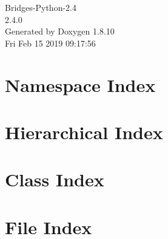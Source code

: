\documentclass[twoside]{book}
\newcommand{\+}{\discretionary{\mbox{\scriptsize$\hookleftarrow$}}{}{}}
\newcommand{\clearemptydoublepage}{%
  \newpage{\pagestyle{empty}\cleardoublepage}%
}
\begin{document}
\hypersetup{pageanchor=false,
             bookmarks=true,
             bookmarksnumbered=true,
             pdfencoding=unicode
            }
\begin{titlepage}
\vspace*{7cm}
\begin{center}%
{\Large Bridges-\/\+Python-\/2.4 \\[1ex]\large 2.\+4.\+0 }\\
\vspace*{1cm}
{\large Generated by Doxygen 1.8.10}\\
\vspace*{0.5cm}
{\small Fri Feb 15 2019 09:17:56}\\
\end{center}
\end{titlepage}
\clearemptydoublepage
\tableofcontents
\clearemptydoublepage
{}
\hypersetup{pageanchor=true}

\chapter{Namespace Index}

\chapter{Hierarchical Index}

\chapter{Class Index}

\chapter{File Index}

\end{document}

